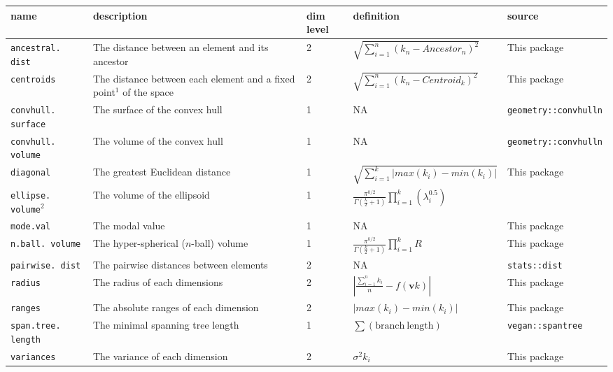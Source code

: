 \documentclass[12pt,letterpaper]{article}
\begin{document}
\begin{table}
\resizebox{\textwidth}{!}
{%
    \begin{tabular}{p{2cm}|p{5cm}|p{1cm}|p{5cm}|p{5cm}}
        name & description & dim level & definition & source \\
        \hline
        \texttt{ancestral. dist} & The distance between an element and its ancestor & 2 & $\sqrt{\sum_{i=1}^{n}{({k}_{n}-Ancestor_{n})^2}}$ & This package \\
        \texttt{centroids} & The distance between each element and a fixed point$^1$ of the space & 2 & $\sqrt{\sum_{i=1}^{n}{({k}_{n}-Centroid_{k})^2}}$ & This package \\
        \texttt{convhull. surface} & The surface of the convex hull & 1 & NA & \texttt{geometry::convhulln} \\
        \texttt{convhull. volume} & The volume of the convex hull & 1 & NA & \texttt{geometry::convhulln} \\
        \texttt{diagonal} & The greatest Euclidean distance & 1 & $\sqrt{\sum_{i=1}^{k}|max(k_i) - min(k_i)|}$ & This package \\
        \texttt{ellipse. volume}$^2$ & The volume of the ellipsoid & 1 & $\frac{\pi^{k/2}}{\Gamma(\frac{k}{2}+1)}\displaystyle\prod_{i=1}^{k} (\lambda_{i}^{0.5})$ & \cite{DonohueDim}\\
        \texttt{mode.val} & The modal value & 1 & NA & This package\\
        \texttt{n.ball. volume} & The hyper-spherical ($n$-ball) volume & 1 & $\frac{\pi^{k/2}}{\Gamma(\frac{k}{2}+1)}\displaystyle\prod_{i=1}^{k} R$ & This package\\
        \texttt{pairwise. dist} & The pairwise distances between elements & 2 & NA & \texttt{stats::dist}\\        
        \texttt{radius} & The radius of each dimensions & 2 & $|\frac{\sum_{i=1}^{n}k_i}{n} - f(\mathbf{v}k)|$ & This package\\
        \texttt{ranges} & The absolute ranges of each dimension & 2 & $|max(k_i) - min(k_i)|$ & This package \\
        \texttt{span.tree. length} & The minimal spanning tree length & 1 & $\sum(\mathrm{branch\ length})$ & \texttt{vegan::spantree}\\        
        \texttt{variances} & The variance of each dimension & 2 & $\sigma^{2}{k_i}$ & This package \\
    \end{tabular}
}%

\end{table}
\end{document}
